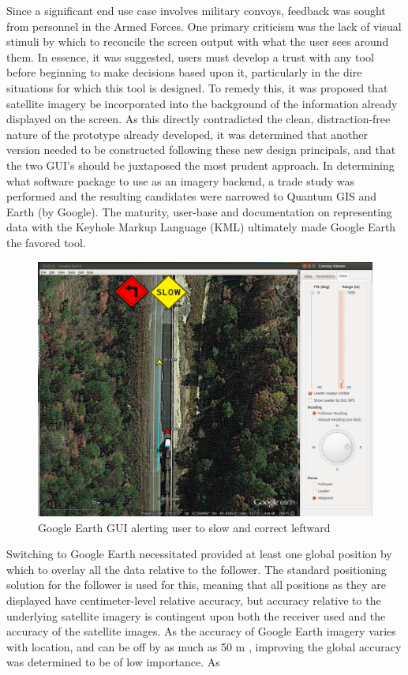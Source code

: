 \documentclass[twocolumn,10pt]{article}
\begin{document}
    Since a significant end use case involves military convoys, feedback was sought from personnel in the Armed Forces.  One primary criticism was the lack of visual stimuli by which to reconcile the screen output with what the user sees around them.  In essence, it was suggested, users must develop a trust with any tool before beginning to make decisions based upon it, particularly in the dire situations for which this tool is designed.  To remedy this, it was proposed that satellite imagery be incorporated into the background of the information already displayed on the screen.  As this directly contradicted the clean, distraction-free nature of the prototype already developed, it was determined that another version needed to be constructed following these new design principals, and that the two GUI's should be juxtaposed the most prudent approach.  In determining what software package to use as an imagery backend, a trade study was performed and the resulting candidates were narrowed to Quantum GIS and Earth (by Google).  The maturity, user-base and documentation on representing data with the Keyhole Markup Language (KML) ultimately made Google Earth the favored tool.

    \begin{figure}[ht] \centering
      \includegraphics[width=\columnwidth] {../graphics/earth_slow.png}
      \caption{Google Earth GUI alerting user to slow and correct leftward}
      \label{fig:earth_alerts}
    \end{figure}

    Switching to Google Earth necessitated provided at least one global position by which to overlay all the data relative to the follower.  The standard positioning solution for the follower is used for this, meaning that all positions as they are displayed have centimeter-level relative accuracy, but accuracy relative to the underlying satellite imagery is contingent upon both the receiver used and the accuracy of the satellite images.  As the accuracy of Google Earth imagery varies with location, and can be off by as much as 50 m \cite{ge_accuracy}, improving the global accuracy was determined to be of low importance.  As 
\end{document}
